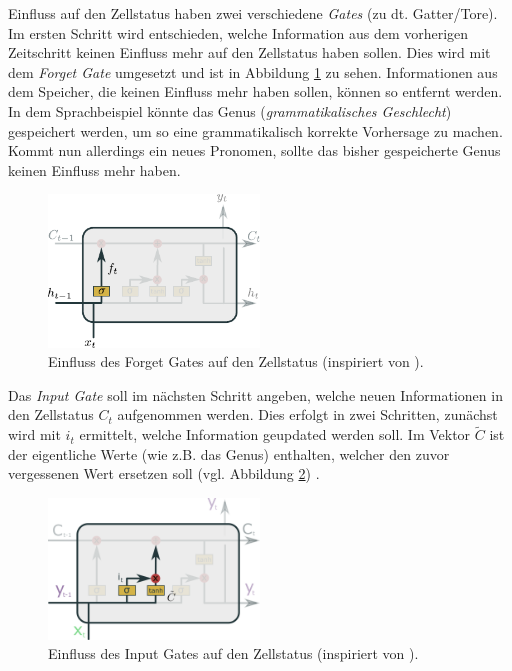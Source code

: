     Einfluss auf den Zellstatus haben zwei verschiedene \textit{Gates} (zu dt. Gatter/Tore).
    Im ersten Schritt wird entschieden, welche Information aus dem vorherigen Zeitschritt keinen Einfluss mehr auf den Zellstatus haben sollen.
    Dies wird mit dem \textit{Forget Gate} umgesetzt und ist in Abbildung \ref{fig:LSTM_Forget} zu sehen.
    Informationen aus dem Speicher, die keinen Einfluss mehr haben sollen, können so entfernt werden.
    In dem Sprachbeispiel könnte das Genus (\textit{grammatikalisches Geschlecht}) gespeichert werden, um so eine grammatikalisch korrekte Vorhersage zu machen.
    Kommt nun allerdings ein neues Pronomen, sollte das bisher gespeicherte Genus keinen Einfluss mehr haben.
    	\begin{figure}[ht]
    		\centering
    		\includegraphics[width=0.5\textwidth]{images/Illustrationen/LSTM_FG}
    		\caption{Einfluss des Forget Gates auf den Zellstatus (inspiriert von \cite{OLAH2015}).}
    		\label{fig:LSTM_Forget}
    	\end{figure}
    	
    Das \textit{Input Gate} soll im nächsten Schritt angeben, welche neuen Informationen in den Zellstatus $C_t$ aufgenommen werden.
    Dies erfolgt in zwei Schritten, zunächst wird mit $i_t$ ermittelt, welche Information geupdated werden soll.
    Im Vektor $\tilde{C}$ ist der eigentliche Werte (wie z.B. das Genus) enthalten, welcher den zuvor vergessenen Wert ersetzen soll (vgl. Abbildung \ref{fig:LSTM_Input}) . 
    	\begin{figure}[ht]
    		\centering
    		\includegraphics[width=0.5\textwidth]{images/Illustrationen/LSTM_IG2}
    		\caption{Einfluss des Input Gates auf den Zellstatus (inspiriert von \cite{OLAH2015}).}
    		\label{fig:LSTM_Input}
    	\end{figure}
    
